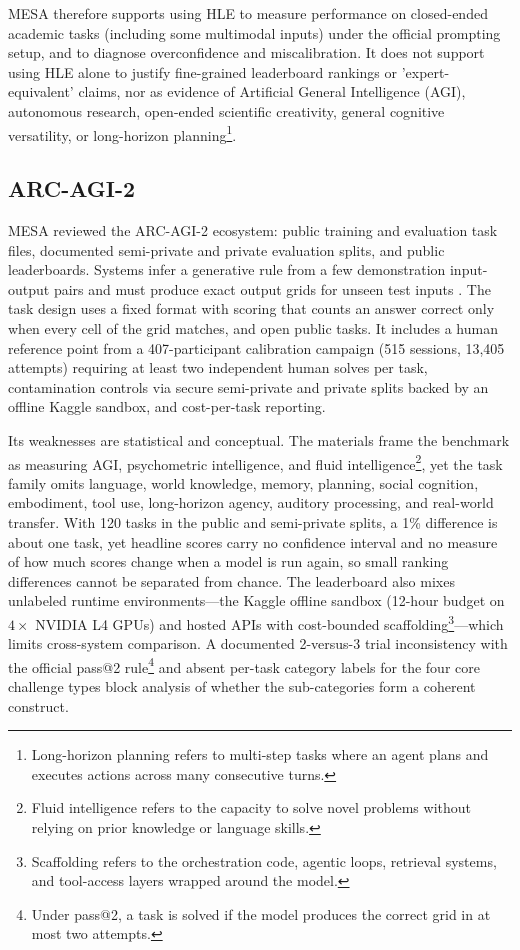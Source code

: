 \documentclass[conference]{IEEEtran}
\begin{document}
        MESA therefore supports using HLE to measure performance on closed-ended academic tasks (including some multimodal inputs) under the official prompting setup, and to diagnose overconfidence and miscalibration. It does not support using HLE alone to justify fine-grained leaderboard rankings or 'expert-equivalent' claims, nor as evidence of Artificial General Intelligence (AGI), autonomous research, open-ended scientific creativity, general cognitive versatility, or long-horizon planning\footnote{Long-horizon planning refers to multi-step tasks where an agent plans and executes actions across many consecutive turns.}.
    
    \subsection{ARC-AGI-2}
    
        MESA reviewed the ARC-AGI-2 ecosystem: public training and evaluation task files, documented semi-private and private evaluation splits, and public leaderboards. Systems infer a generative rule from a few demonstration input-output pairs and must produce exact output grids for unseen test inputs \cite{chollet_arc_agi_2_2025}. The task design uses a fixed format with scoring that counts an answer correct only when every cell of the grid matches, and open public tasks. It includes a human reference point from a 407-participant calibration campaign (515 sessions, 13{,}405 attempts) requiring at least two independent human solves per task, contamination controls via secure semi-private and private splits backed by an offline Kaggle sandbox, and cost-per-task reporting.

        Its weaknesses are statistical and conceptual. The materials frame the benchmark as measuring AGI, psychometric intelligence, and fluid intelligence\footnote{Fluid intelligence refers to the capacity to solve novel problems without relying on prior knowledge or language skills.}, yet the task family omits language, world knowledge, memory, planning, social cognition, embodiment, tool use, long-horizon agency, auditory processing, and real-world transfer. With 120 tasks in the public and semi-private splits, a 1\% difference is about one task, yet headline scores carry no confidence interval and no measure of how much scores change when a model is run again, so small ranking differences cannot be separated from chance. The leaderboard also mixes unlabeled runtime environments---the Kaggle offline sandbox (12-hour budget on $4\times$ NVIDIA L4 GPUs) and hosted APIs with cost-bounded scaffolding\footnote{Scaffolding refers to the orchestration code, agentic loops, retrieval systems, and tool-access layers wrapped around the model.}---which limits cross-system comparison. A documented 2-versus-3 trial inconsistency with the official pass@2 rule\footnote{Under pass@2, a task is solved if the model produces the correct grid in at most two attempts.} and absent per-task category labels for the four core challenge types block analysis of whether the sub-categories form a coherent construct.
        
\end{document}
